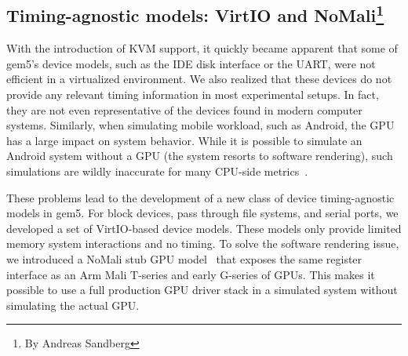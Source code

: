 \subsection[Timing-agnostic models: VirtIO and NoMali]{Timing-agnostic models: VirtIO and NoMali\footnote{By Andreas Sandberg}}
\label{sec:virtio-nomali}

With the introduction of KVM support, it quickly became apparent that some of gem5’s device models, such as the IDE disk interface or the UART, were not efficient in a virtualized environment.
We also realized that these devices do not provide any relevant timing information in most experimental setups.
In fact, they are not even representative of the devices found in modern computer systems.
Similarly, when simulating mobile workload, such as Android, the GPU has a large impact on system behavior.
While it is possible to simulate an Android system without a GPU (the system resorts to software rendering), such simulations are wildly inaccurate for many CPU-side metrics~\cite{nomali}.

These problems lead to the development of a new class of device timing-agnostic models in gem5.
For block devices, pass through file systems, and serial ports, we developed a set of VirtIO-based device models.
These models only provide limited memory system interactions and no timing. To solve the software rendering issue, we introduced a NoMali stub GPU model~\cite{nomali} that exposes the same register interface as an Arm Mali T-series and early G-series of GPUs.
This makes it possible to use a full production GPU driver stack in a simulated system without simulating the actual GPU.
